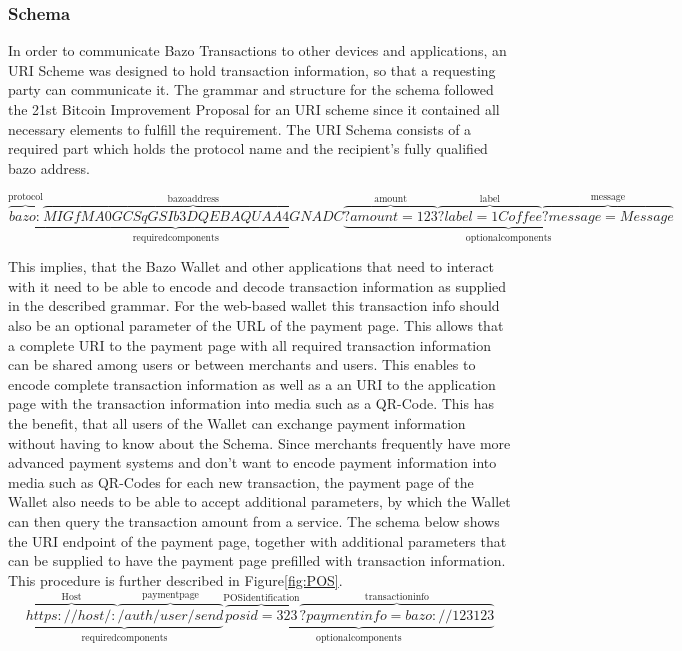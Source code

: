 \documentclass[a4paper]{article}
\begin{document}
\subsubsection{Schema}
In order to communicate Bazo Transactions to other devices and applications, an URI Scheme was designed to hold transaction information, so that a requesting party can communicate it. The grammar and structure for the schema followed the \cite{bip21} 21st Bitcoin Improvement Proposal for an URI scheme since it contained all necessary elements to fulfill the requirement. The URI Schema consists of a required part which holds the protocol name and the recipient's fully qualified bazo address.


\[
\underbrace{\overbrace{bazo:}^{\mathrm{protocol}}\overbrace{MIGfMA0GCSqGSIb3DQEBAQUAA4GNADC}^{\mathrm{bazo address}}}_{\mathrm{required components}}
\underbrace{\overbrace{?amount=123}^{\mathrm{amoun t}}\overbrace{?label=1 Coffee}^{\mathrm{label}}\overbrace{?message=Message}^{\mathrm{message}}}_{\mathrm{optional components}}
\]


This implies, that the Bazo Wallet and other applications that need to interact with it need to be able to encode and decode transaction information as supplied in the described grammar.
For the web-based wallet this transaction info should also be an optional parameter of the URL of the payment page. This allows that a complete URI to the payment page with all required transaction information can be shared among users or between merchants and users.
This enables to encode complete transaction information as well as a an URI to the application page with the transaction information into media such as a QR-Code. This has the benefit, that all users of the Wallet can exchange payment information without having to know about the Schema.
Since merchants frequently have more advanced payment systems and don't want to encode payment information into media such as QR-Codes for each new transaction, the payment page of the Wallet also needs to be able to accept additional parameters, by which the Wallet can then query the transaction amount from a service.
The schema below shows the URI endpoint of the payment page, together with additional parameters that can be supplied to have the payment page prefilled with transaction information. This procedure is further described in Figure\ref{fig:POS}.
\[
\underbrace{\overbrace{https://host/:}^{\mathrm{Host}}\overbrace{/auth/user/send}^{\mathrm{payment page}}}_{\mathrm{required components}}
\underbrace{\overbrace{posid=323}^{\mathrm{POS identification}}\overbrace{?paymentinfo=bazo://123123}^{\mathrm{transaction info}}}_{\mathrm{optional components}}
\]
\end{document}
